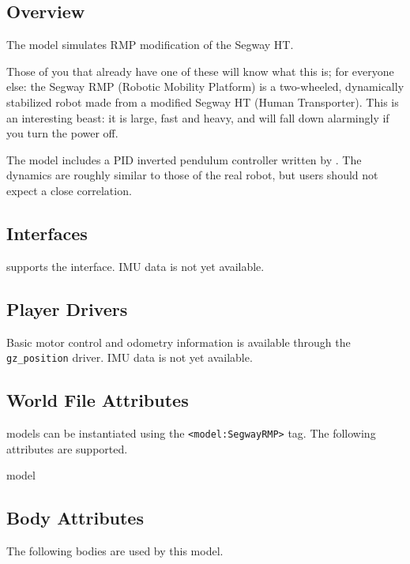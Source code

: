 
\subsection{Overview}

The {\tt \modelName} model simulates RMP modification of the Segway HT.

Those of you that already have one of these will know what this is;
for everyone else: the Segway RMP (Robotic Mobility Platform) is a
two-wheeled, dynamically stabilized robot made from a modified Segway
HT (Human Transporter).  This is an interesting beast: it is large,
fast and heavy, and will fall down alarmingly if you turn the power
off.

The {\tt \modelName} model includes a PID inverted pendulum controller
written by \mkobilar.  The dynamics are roughly similar to those of
the real robot, but users should not expect a close correlation.




\subsection{\libgazebo Interfaces}

{\tt \modelName} supports the  interface.  
IMU data is not yet available.


\subsection{Player Drivers}

Basic motor control and odometry information is available through the
{\tt gz\_position} driver.  IMU data is not yet available.

\subsection{World File Attributes}

{\tt \modelName} models can be instantiated using the
\verb+<model:SegwayRMP>+ tag.  The following attributes are
supported.

\begin{xmlattrtable}{model}{\modelName}
\modeldefaults
\end{xmlattrtable}

\subsection{Body Attributes}

The following bodies are used by this model.

\begin{bodyattrtable}
\bodydefaults
{}
\end{bodyattrtable}


